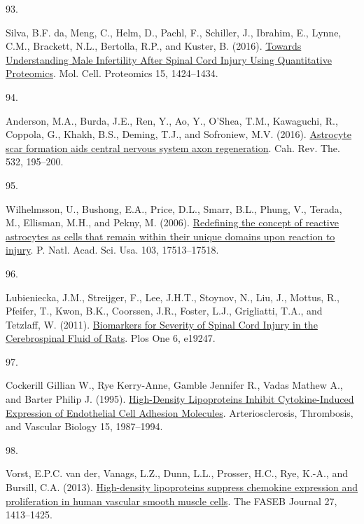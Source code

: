 \documentclass[
]{article}
\newlength{\cslhangindent}
\newlength{\csllabelwidth}
\newlength{\cslentryspacingunit} %
\newenvironment{CSLReferences}[2] %
 {%
  \setlength{\parindent}{0pt}
  \ifodd #1
  \let\oldpar\par
  \def\par{\hangindent=\cslhangindent\oldpar}
  \fi
  \setlength{\parskip}{#2\cslentryspacingunit}
 }%
 {}
\newcommand{\CSLLeftMargin}[1]{\parbox[t]{\csllabelwidth}{#1}}
\newcommand{\CSLRightInline}[1]{\parbox[t]{\linewidth - \csllabelwidth}{#1}\break}
\begin{document}
\begin{CSLReferences}{0}{0}
\leavevmode{}%
\CSLLeftMargin{93. }
\CSLRightInline{Silva, B.F. da, Meng, C., Helm, D., Pachl, F., Schiller, J., Ibrahim, E., Lynne, C.M., Brackett, N.L., Bertolla, R.P., and Kuster, B. (2016). \href{https://doi.org/10.1074/mcp.M115.052175}{Towards {Understanding Male Infertility After Spinal Cord Injury Using Quantitative Proteomics}}. Mol. Cell. Proteomics 15, 1424--1434.}

\leavevmode{}%
\CSLLeftMargin{94. }
\CSLRightInline{Anderson, M.A., Burda, J.E., Ren, Y., Ao, Y., O'Shea, T.M., Kawaguchi, R., Coppola, G., Khakh, B.S., Deming, T.J., and Sofroniew, M.V. (2016). \href{https://doi.org/10.1038/nature17623}{Astrocyte scar formation aids central nervous system axon regeneration}. Cah. Rev. The. 532, 195--200.}

\leavevmode{}%
\CSLLeftMargin{95. }
\CSLRightInline{Wilhelmsson, U., Bushong, E.A., Price, D.L., Smarr, B.L., Phung, V., Terada, M., Ellisman, M.H., and Pekny, M. (2006). \href{https://doi.org/10.1073/pnas.0602841103}{Redefining the concept of reactive astrocytes as cells that remain within their unique domains upon reaction to injury}. P. Natl. Acad. Sci. Usa. 103, 17513--17518.}

\leavevmode{}%
\CSLLeftMargin{96. }
\CSLRightInline{Lubieniecka, J.M., Streijger, F., Lee, J.H.T., Stoynov, N., Liu, J., Mottus, R., Pfeifer, T., Kwon, B.K., Coorssen, J.R., Foster, L.J., Grigliatti, T.A., and Tetzlaff, W. (2011). \href{https://doi.org/10.1371/journal.pone.0019247}{Biomarkers for {Severity} of {Spinal Cord Injury} in the {Cerebrospinal Fluid} of {Rats}}. Plos One 6, e19247.}

\leavevmode{}%
\CSLLeftMargin{97. }
\CSLRightInline{Cockerill Gillian W., Rye Kerry-Anne, Gamble Jennifer R., Vadas Mathew A., and Barter Philip J. (1995). \href{https://doi.org/10.1161/01.ATV.15.11.1987}{High-{Density Lipoproteins Inhibit Cytokine-Induced Expression} of {Endothelial Cell Adhesion Molecules}}. Arteriosclerosis, Thrombosis, and Vascular Biology 15, 1987--1994.}

\leavevmode{}%
\CSLLeftMargin{98. }
\CSLRightInline{Vorst, E.P.C. van der, Vanags, L.Z., Dunn, L.L., Prosser, H.C., Rye, K.-A., and Bursill, C.A. (2013). \href{https://doi.org/10.1096/fj.12-212753}{High-density lipoproteins suppress chemokine expression and proliferation in human vascular smooth muscle cells}. The FASEB Journal 27, 1413--1425.}


\end{CSLReferences}
\end{document}
